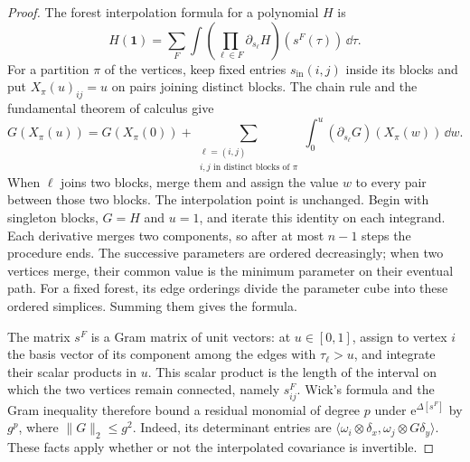 \begin{proof}
The forest interpolation formula for a polynomial $H$ is
\[
 H(\mathbf1)=\sum_F\int
       \left(\prod_{\ell\in F}\partial_{s_\ell}H\right)
                                 (s^F(\tau))\,\dd\tau.
\]
For a partition $\pi$ of the vertices, keep fixed
entries $s_{\mathrm{in}}(i,j)$ inside its blocks and
put $X_\pi(u)_{ij}=u$ on pairs joining distinct blocks.
The chain rule and the fundamental theorem of calculus give
\begin{equation}\label{eq:interacting-forest-first-step}
 G(X_\pi(u))=G(X_\pi(0))
       +\sum_{\substack{\ell=(i,j)\\
                        i,j\text{ in distinct blocks of }\pi}}
          \int_0^u(\partial_{s_\ell}G)(X_\pi(w))\,\dd w .
\end{equation}
When $\ell$ joins two blocks, merge them and assign
the value $w$ to every pair between those two blocks.
The interpolation point is unchanged. Begin with singleton
blocks, $G=H$ and $u=1$, and iterate this identity
on each integrand. Each derivative
merges two components, so after at most $n-1$
steps the procedure ends. The successive
parameters are ordered decreasingly; when two
vertices merge, their common value is the
minimum parameter on their eventual path.
For a fixed forest, its edge orderings divide
the parameter cube into these ordered simplices.
Summing them gives the formula.

The matrix $s^F$ is a Gram matrix of unit
vectors: at $u\in[0,1]$, assign to vertex $i$
the basis vector of its component among the
edges with $\tau_\ell>u$, and integrate their
scalar products in $u$. This scalar product
is the length of the interval on which the
two vertices remain connected, namely
$s_{ij}^F$. Wick's formula and the Gram
inequality therefore bound a residual monomial
of degree $p$ under $\mathrm e^{\Delta[s^F]}$
by $g^p$, where $\|G\|_2\le g^2$.
Indeed, its determinant entries are
$\langle\omega_i\otimes\delta_x,\omega_j\otimes G\delta_y\rangle$.
These facts apply whether or not the
interpolated covariance is invertible.


\end{proof}
